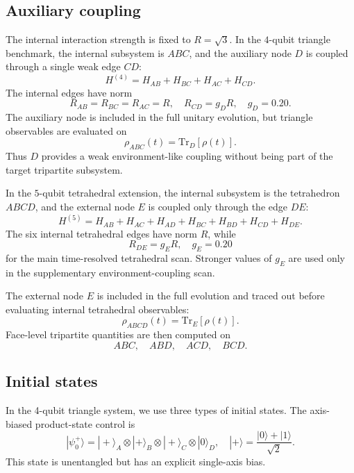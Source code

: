 \documentclass[aps,physrev,preprint,groupedaddress]{revtex4-2}
\begin{document}
\subsection{Auxiliary coupling}\label{sm:numerics-auxiliary}

The internal interaction strength is fixed to $R=\sqrt{3}$. In the $4$-qubit triangle benchmark, the internal subsystem is $ABC$, and the auxiliary node $D$ is coupled through a single weak edge $CD$:
\begin{equation}
    H^{(4)}=H_{AB}+H_{BC}+H_{AC}+H_{CD}.
\end{equation}
The internal edges have norm
\begin{equation}
    R_{AB}=R_{BC}=R_{AC}=R, \quad R_{CD}=g_D R, \quad g_D=0.20 .
\end{equation}
The auxiliary node is included in the full unitary evolution, but triangle observables are evaluated on
\begin{equation}
    \rho_{ABC}(t) = {\mathrm{Tr}}_{D}[\rho(t)] .
\end{equation}
Thus $D$ provides a weak environment-like coupling without being part of the target tripartite subsystem.

In the $5$-qubit tetrahedral extension, the internal subsystem is the tetrahedron $ABCD$, and the external node $E$ is coupled only through the edge $DE$:
\begin{equation}
    H^{(5)}=H_{AB}+H_{AC}+H_{AD}+H_{BC}+H_{BD}+H_{CD}+H_{DE}.
\end{equation}
The six internal tetrahedral edges have norm $R$, while
\begin{equation}
    R_{DE}=g_E R, \quad g_E=0.20
\end{equation}
for the main time-resolved tetrahedral scan. Stronger values of $g_E$ are used only in the supplementary environment-coupling scan.

The external node $E$ is included in the full evolution and traced out before evaluating internal tetrahedral observables:
\begin{equation}
    \rho_{ABCD}(t) = {\mathrm{Tr}}_{E}[\rho(t)] .
\end{equation}
Face-level tripartite quantities are then computed on
\begin{equation}
    ABC,\quad ABD,\quad ACD,\quad BCD .
\end{equation}

\subsection{Initial states}\label{sm:numerics-initial-states}
In the 4-qubit triangle system, we use three types of initial states. The axis-biased product-state control is
\begin{equation}
    |\psi_0^{+}\rangle = |+\rangle_A\otimes |+\rangle_B\otimes |+\rangle_C \otimes |0\rangle_D,
    \quad |+\rangle=\frac{|0\rangle+|1\rangle}{\sqrt2}.
\end{equation}
This state is unentangled but has an explicit single-axis bias.
\end{document}
